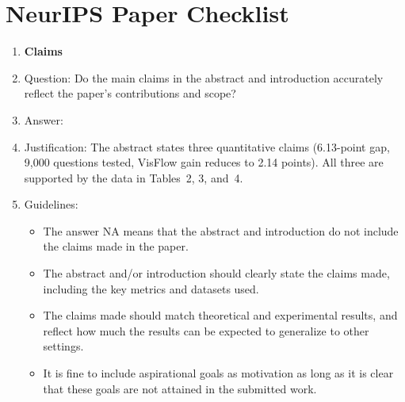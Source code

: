 \section*{NeurIPS Paper Checklist}

\begin{enumerate}

\item {\bf Claims}
\item[] Question: Do the main claims in the abstract and introduction accurately
reflect the paper's contributions and scope?
\item[] Answer: \answerYes{}
\item[] Justification: The abstract states three quantitative claims (6.13-point
gap, 9,000 questions tested, VisFlow gain reduces to 2.14 points). All three
are supported by the data in Tables~2, 3, and~4.
\item[] Guidelines:
\begin{itemize}
    \item The answer NA means that the abstract and introduction do not include
    the claims made in the paper.
    \item The abstract and/or introduction should clearly state the claims made,
    including the key metrics and datasets used.
    \item The claims made should match theoretical and experimental results, and
    reflect how much the results can be expected to generalize to other settings.
    \item It is fine to include aspirational goals as motivation as long as it is
    clear that these goals are not attained in the submitted work.
\end{itemize}


\end{enumerate}
